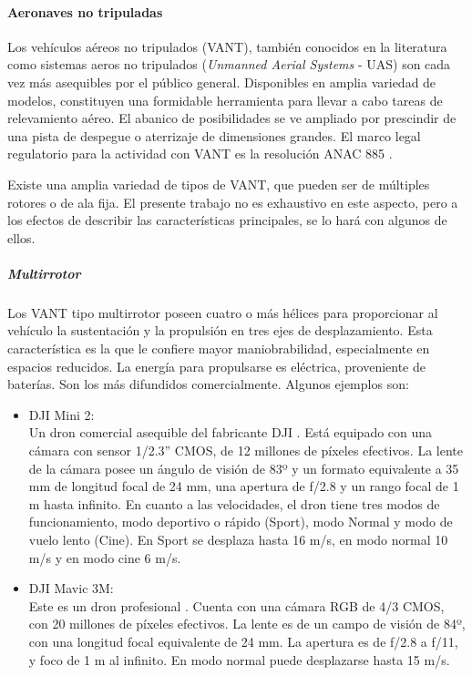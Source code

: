 \paragraph{Aeronaves no tripuladas}
Los vehículos aéreos no tripulados (VANT), también conocidos en la literatura como sistemas aeros no tripulados (\textit{Unmanned Aerial Systems} - UAS) son cada vez más asequibles por el público general. Disponibles en amplia variedad de modelos, constituyen una formidable herramienta para llevar a cabo tareas de relevamiento aéreo. El abanico de posibilidades se ve ampliado por prescindir de una pista de despegue o aterrizaje de dimensiones grandes. El marco legal regulatorio para la actividad con VANT es la resolución ANAC 885 \cite{noauthor_infoleg_nodate}.

Existe una amplia variedad de tipos de VANT, que pueden ser de múltiples rotores o de ala fija. El presente trabajo no es exhaustivo en este aspecto, pero a los efectos de describir las características principales, se lo hará con algunos de ellos.
\subparagraph{Multirrotor}
Los VANT tipo multirrotor poseen cuatro o más hélices para proporcionar al vehículo la sustentación y la propulsión en tres ejes de desplazamiento. Esta característica es la que le confiere mayor maniobrabilidad, especialmente en espacios reducidos. La energía para propulsarse es eléctrica, proveniente de baterías. Son los más difundidos comercialmente. Algunos ejemplos son:
\begin{itemize}
    \item DJI Mini 2:\\
    Un dron comercial asequible del fabricante DJI \cite{noauthor_dji_nodate-1}. Está equipado con una cámara con sensor 1/2.3” CMOS, de 12 millones de píxeles efectivos. La lente de la cámara posee un ángulo de visión de 83º y un formato equivalente a 35 mm de longitud focal de 24 mm, una apertura de f/2.8 y un rango focal de 1 m hasta infinito. En cuanto a las velocidades, el dron tiene tres modos de funcionamiento, modo deportivo o rápido (Sport), modo Normal y modo de vuelo lento (Cine). En Sport se desplaza hasta 16 m/s, en modo normal 10 m/s y en modo cine 6 m/s.
    \item DJI Mavic 3M:\\
    Este es un dron profesional \cite{noauthor_dji_nodate}. Cuenta con una cámara RGB de 4/3 CMOS, con 20 millones de píxeles efectivos. La lente es de un campo de visión de 84º, con una longitud focal equivalente de 24 mm. La apertura es de f/2.8 a f/11, y foco de 1 m al infinito. En modo normal puede desplazarse hasta 15 m/s.
\end{itemize}

